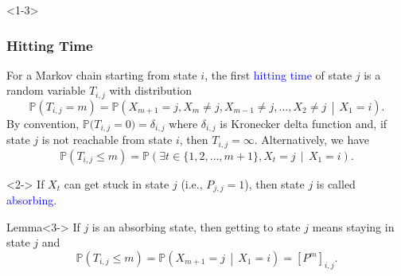 \documentclass[10pt,english,aspectratio=169]{beamer}
\renewcommand{\Pr}{\mathbb{P}}
\begin{document}
\begin{frame}

\end{frame}

\begin{frame}<1-3> \frametitle{Hitting Time}

\begin{definition}For a Markov chain starting from state $i$, the first \textcolor{blue}{hitting time} of state $j$ is a random variable $T_{i,j}$ with distribution \vspace{-2mm}
\[
\Pr\left(T_{i,j}=m\right)=\Pr\left(X_{m+1}=j,X_{m}\neq j,X_{m-1}\neq j,\ldots,X_{2}\neq j\,\middle|\,X_{1}=i\right).
\]
By convention, $\Pr\big(T_{i,j}=0\big)=\delta_{i,j}$ where $\delta_{i,j}$ is Kronecker delta function and,  if state $j$ is not reachable from state $i$, then $T_{i,j} = \infty$.
Alternatively, we have
\vspace{-2mm}
\[
\Pr\left(T_{i,j} \leq m\right)=\Pr\left(\exists t \in \{1,2,\ldots,m+1\}, X_{t}=j \,\middle|\,X_{1}=i\right).
\]
\end{definition}

\vspace{1mm}


\begin{definition}<2->
If $X_t$ can get stuck in state $j$ (i.e., $P_{j,j} = 1$), then state $j$ is called \textcolor{blue}{absorbing}.
\end{definition}


\begin{exampleblock}{Lemma}<3->
If $j$ is an absorbing state, then getting to state $j$ means staying in state $j$ and \vspace{-1.75mm}
\[
\Pr\left(T_{i,j} \leq m\right)= \Pr\left(X_{m+1} = j \,\middle|\,X_{1}=i\right)=\left[P^{m}\right]_{i,j}.
\]
\end{exampleblock}



\end{frame}
\end{document}
